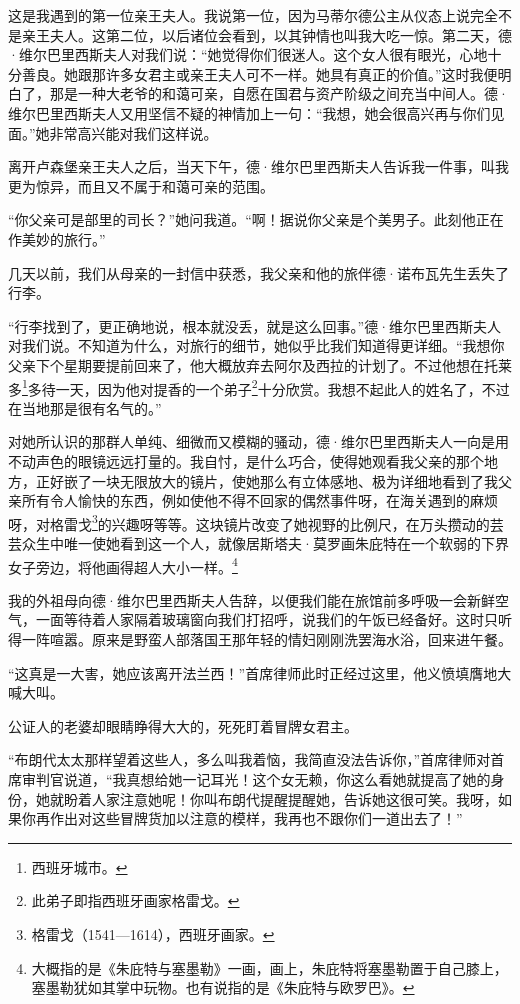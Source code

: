 \par 这是我遇到的第一位亲王夫人。我说第一位，因为马蒂尔德公主从仪态上说完全不是亲王夫人。这第二位，以后诸位会看到，以其钟情也叫我大吃一惊。第二天，德·维尔巴里西斯夫人对我们说：“她觉得你们很迷人。这个女人很有眼光，心地十分善良。她跟那许多女君主或亲王夫人可不一样。她具有真正的价值。”这时我便明白了，那是一种大老爷的和蔼可亲，自愿在国君与资产阶级之间充当中间人。德·维尔巴里西斯夫人又用坚信不疑的神情加上一句：“我想，她会很高兴再与你们见面。”她非常高兴能对我们这样说。
\par 离开卢森堡亲王夫人之后，当天下午，德·维尔巴里西斯夫人告诉我一件事，叫我更为惊异，而且又不属于和蔼可亲的范围。
\par “你父亲可是部里的司长？”她问我道。“啊！据说你父亲是个美男子。此刻他正在作美妙的旅行。”
\par 几天以前，我们从母亲的一封信中获悉，我父亲和他的旅伴德·诺布瓦先生丢失了行李。
\par “行李找到了，更正确地说，根本就没丢，就是这么回事。”德·维尔巴里西斯夫人对我们说。不知道为什么，对旅行的细节，她似乎比我们知道得更详细。“我想你父亲下个星期要提前回来了，他大概放弃去阿尔及西拉的计划了。不过他想在托莱多\footnote{西班牙城市。}多待一天，因为他对提香的一个弟子\footnote{此弟子即指西班牙画家格雷戈。}十分欣赏。我想不起此人的姓名了，不过在当地那是很有名气的。”
\par 对她所认识的那群人单纯、细微而又模糊的骚动，德·维尔巴里西斯夫人一向是用不动声色的眼镜远远打量的。我自忖，是什么巧合，使得她观看我父亲的那个地方，正好嵌了一块无限放大的镜片，使她那么有立体感地、极为详细地看到了我父亲所有令人愉快的东西，例如使他不得不回家的偶然事件呀，在海关遇到的麻烦呀，对格雷戈\footnote{格雷戈（1541—1614），西班牙画家。}的兴趣呀等等。这块镜片改变了她视野的比例尺，在万头攒动的芸芸众生中唯一使她看到这一个人，就像居斯塔夫·莫罗画朱庇特在一个软弱的下界女子旁边，将他画得超人大小一样。\footnote{大概指的是《朱庇特与塞墨勒》一画，画上，朱庇特将塞墨勒置于自己膝上，塞墨勒犹如其掌中玩物。也有说指的是《朱庇特与欧罗巴》。}
\par 我的外祖母向德·维尔巴里西斯夫人告辞，以便我们能在旅馆前多呼吸一会新鲜空气，一面等待着人家隔着玻璃窗向我们打招呼，说我们的午饭已经备好。这时只听得一阵喧嚣。原来是野蛮人部落国王那年轻的情妇刚刚洗罢海水浴，回来进午餐。
\par “这真是一大害，她应该离开法兰西！”首席律师此时正经过这里，他义愤填膺地大喊大叫。
\par 公证人的老婆却眼睛睁得大大的，死死盯着冒牌女君主。
\par “布朗代太太那样望着这些人，多么叫我着恼，我简直没法告诉你，”首席律师对首席审判官说道，“我真想给她一记耳光！这个女无赖，你这么看她就提高了她的身份，她就盼着人家注意她呢！你叫布朗代提醒提醒她，告诉她这很可笑。我呀，如果你再作出对这些冒牌货加以注意的模样，我再也不跟你们一道出去了！”
